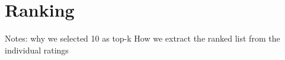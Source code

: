 \section{Ranking}\label{sec:ranking}
Notes: 
why we selected 10 as top-k
How we extract the ranked list from the individual ratings